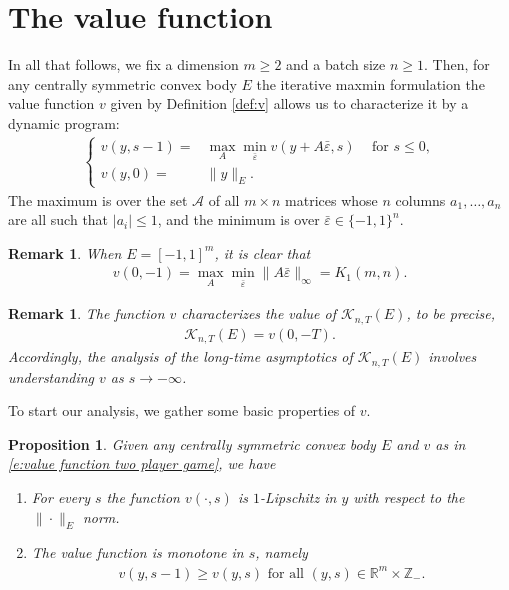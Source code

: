 \documentclass[reqno]{amsart}
\newtheorem{proposition}[theorem]{Proposition}
\newtheorem{remark}[theorem]{Remark}
\numberwithin{equation}{section}
\begin{document}
\section{The value function}\label{s:the value function}

In all that follows, we fix a dimension $m \geq 2$ and a batch size $n \geq 1$. Then, for any centrally symmetric convex body $E$ the iterative maxmin formulation the value function $v$ given by Definition \ref{def:v}  allows us to characterize it by a dynamic program:
\begin{align}\label{e:value function two player game}
  \left \{ \begin{array}{rl} v(y,s-1) = &  \max \limits_{A} \min \limits_{\bar \varepsilon} v(y+A\bar \varepsilon ,s) \;\;\;\text{ for } s\leq 0,\\
  v(y,0) = & \|y\|_E. \end{array} \right.
\end{align}
 The maximum is over the set $\mathcal A$ of all $m\times n$ matrices whose $n$ columns $a_1,\ldots,a_n$ are all such that $|a_i|\leq 1$, and the minimum is over $\bar \varepsilon \in \{-1,1\}^n$.

\begin{remark}
When $E= [-1,1]^m$, it is clear that 
\begin{align*}
  v(0,-1)  = \max \limits_{A} \min_{\bar \varepsilon} \|A\bar \varepsilon\|_\infty = K_1(m,n).
\end{align*} 
\end{remark}

\begin{remark}
The function $v$ characterizes the value of $\mathcal{K}_{n,T}(E)$, to be precise,
\begin{align*}
  \mathcal{K}_{n,T}(E) = v(0,-T).    
\end{align*}
Accordingly, the analysis of the long-time asymptotics of $\mathcal{K}_{n,T}(E)$ involves understanding $v$ as $s\to -\infty$.
\end{remark}

To start our analysis, we gather some basic properties of $v$.
\begin{proposition}
  Given any centrally symmetric convex body $E$ and $v$ as in \eqref{e:value function two player game}, we have
  \begin{enumerate}
  
  \item For every $s$ the function $v(\cdot,s)$ is $1$-Lipschitz in $y$ with respect to the $\|\cdot\|_E$ norm.

  \item The value function is monotone in $s$, namely
  \begin{align*}
    v(y,s-1) \geq v(y,s) \text{ for all } (y,s)\in\mathbb{R}^m\times \mathbb{Z}_-.
  \end{align*}

  \end{enumerate}
\end{proposition}
\end{document}
